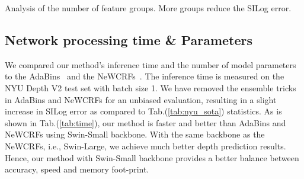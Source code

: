 \documentclass{article} \usepackage{iclr2023_conference, times}
\begin{document}
\begin{table}[!htb]
\scriptsize
\begin{minipage}{.47\linewidth}
\centering
\caption{\small Analysis of the number of feature groups. More groups reduce the SILog error.}\label{tab:dni_channel}
\end{minipage}\hspace{10pt}
\begin{minipage}{.47\linewidth}
\centering
\caption{\small Analysis of the confidence weight matrix  and the difference operator .}\label{tab:dni_component}
\scriptsize
{}
\end{minipage} 
\end{table}

\subsection{Network processing time \& Parameters}
We compared our method's inference time and the number of model parameters to the AdaBins~\citep{bhat2021adabins} and the NeWCRFs~\citep{yuan2022new}.
The inference time is measured on the NYU Depth V2 test set with batch size 1.  We have removed the ensemble tricks in AdaBins and NeWCRFs for an unbiased evaluation, resulting in a slight increase in SILog error as compared to Tab.(\ref{tab:nyu_sota}) statistics. As is shown in Tab.(\ref{tab:time}), our method is faster and better than AdaBins and NeWCRFs using Swin-Small backbone. With the same backbone as the NeWCRFs, i.e., Swin-Large, we achieve much better depth prediction results. Hence, our method with Swin-Small backbone provides a better balance between accuracy, speed and memory foot-print. 
\end{document}
